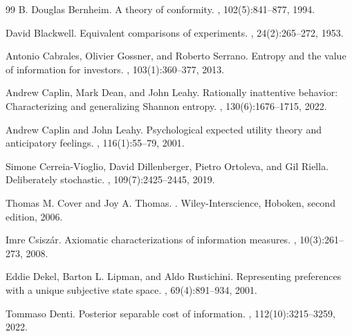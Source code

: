 \documentclass[11pt,a4paper]{article}
\theoremstyle{definition}
\newcommand{\1}{\mathbf 1}
\begin{document}
\begin{thebibliography}{99}
B. Douglas Bernheim.
\newblock A theory of conformity.
, 102(5):841--877, 1994.

David Blackwell.
\newblock Equivalent comparisons of experiments.
, 24(2):265--272, 1953.


Antonio Cabrales, Olivier Gossner, and Roberto Serrano.
\newblock Entropy and the value of information for investors.
, 103(1):360--377, 2013.

Andrew Caplin, Mark Dean, and John Leahy.
\newblock Rationally inattentive behavior: Characterizing and generalizing {S}hannon entropy.
, 130(6):1676--1715, 2022.

Andrew Caplin and John Leahy.
\newblock Psychological expected utility theory and anticipatory feelings.
, 116(1):55--79, 2001.

Simone Cerreia-Vioglio, David Dillenberger, Pietro Ortoleva, and Gil Riella.
\newblock Deliberately stochastic.
, 109(7):2425--2445, 2019.

Thomas M. Cover and Joy A. Thomas.
.
\newblock Wiley-Interscience, Hoboken, second edition, 2006.

Imre Csisz\'ar.
\newblock Axiomatic characterizations of information measures.
, 10(3):261--273, 2008.

Eddie Dekel, Barton L. Lipman, and Aldo Rustichini.
\newblock Representing preferences with a unique subjective state space.
, 69(4):891--934, 2001.

Tommaso Denti.
\newblock Posterior separable cost of information.
, 112(10):3215--3259, 2022.


\end{thebibliography}
\end{document}
